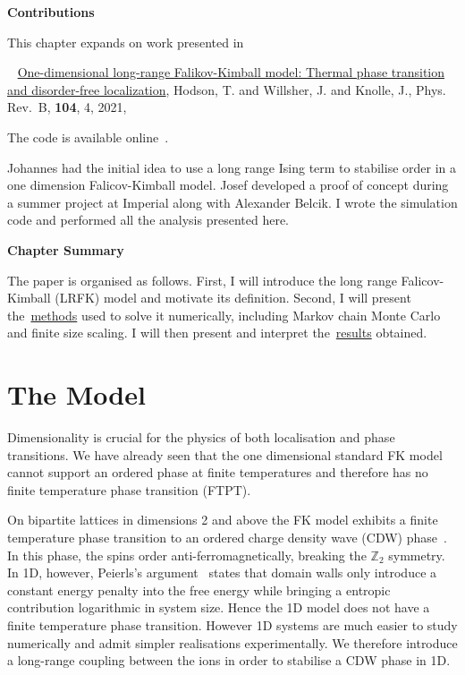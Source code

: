 \textbf{Contributions}

This chapter expands on work presented in

~\autocite{hodsonOnedimensionalLongrangeFalikovKimball2021} \href{https://link.aps.org/doi/10.1103/PhysRevB.104.045116}{One-dimensional long-range Falikov-Kimball model: Thermal phase transition and disorder-free localization}, Hodson, T. and Willsher, J. and Knolle, J., Phys. Rev.~B, \textbf{104}, 4, 2021,

The code is available online~\autocite{hodsonMCMCFKModel2021}.

Johannes had the initial idea to use a long range Ising term to stabilise order in a one dimension Falicov-Kimball model. Josef developed a proof of concept during a summer project at Imperial along with Alexander Belcik. I wrote the simulation code and performed all the analysis presented here.

\textbf{Chapter Summary}

The paper is organised as follows. First, I will introduce the long range Falicov-Kimball (LRFK) model and motivate its definition. Second, I will present the~\protect\hyperlink{sec:lrfk-methods}{methods} used to solve it numerically, including Markov chain Monte Carlo and finite size scaling. I will then present and interpret the~\protect\hyperlink{sec:lrfk-results}{results} obtained.

\hypertarget{sec:lrfk-model}{%
\section{The Model}\label{sec:lrfk-model}}

Dimensionality is crucial for the physics of both localisation and phase transitions. We have already seen that the one dimensional standard FK model cannot support an ordered phase at finite temperatures and therefore has no finite temperature phase transition (FTPT).

On bipartite lattices in dimensions 2 and above the FK model exhibits a finite temperature phase transition to an ordered charge density wave (CDW) phase~\autocite{maskaThermodynamicsTwodimensionalFalicovKimball2006}. In this phase, the spins order anti-ferromagnetically, breaking the \(\mathbb{Z}_2\) symmetry. In 1D, however, Peierls's argument~\autocite{peierlsIsingModelFerromagnetism1936,kennedyItinerantElectronModel1986} states that domain walls only introduce a constant energy penalty into the free energy while bringing a entropic contribution logarithmic in system size. Hence the 1D model does not have a finite temperature phase transition. However 1D systems are much easier to study numerically and admit simpler realisations experimentally. We therefore introduce a long-range coupling between the ions in order to stabilise a CDW phase in 1D.

